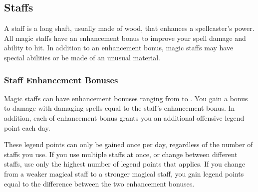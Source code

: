 \begin{comment}
\subsection{Rods}

Rods are scepterlike devices that have unique magical powers and do not usually have charges.
Anyone can use a rod.

\parhead{Physical Description} Rods weigh approximately 5 pounds.

They range from 2 feet to 3 feet long and are usually made of iron or some other metal.
(Many, as noted in their descriptions, can function as light maces or clubs due to their sturdy construction.)

These sturdy items have AC 9, 10 hit points, hardness 10, and a break DC of 27.

\parhead{Activation} Details relating to rod use vary from item to item.
See the individual descriptions for specifics.
\end{comment}

\subsection{Staffs}

A staff is a long shaft, usually made of wood, that enhances a spellcaster's power.
All magic staffs have an enhancement bonus to improve your spell damage and ability to hit.
In addition to an enhancement bonus, magic staffs may have special abilities or be made of an unusual material.

\subsubsection{Staff Enhancement Bonuses}\label{Staff Enhancement Bonuses}

Magic staffs can have enhancement bonuses ranging from  to .
You gain a bonus to damage with damaging spells equal to the staff's enhancement bonus.
In addition, each  of enhancement bonus grants you an additional offensive legend point each day.

These legend points can only be gained once per day, regardless of the number of staffs you use.
If you use multiple staffs at once, or change between different staffs, use only the highest number of legend points that applies.
If you change from a weaker magical staff to a stronger magical staff, you gain legend points equal to the difference between the two enhancement bonuses.


